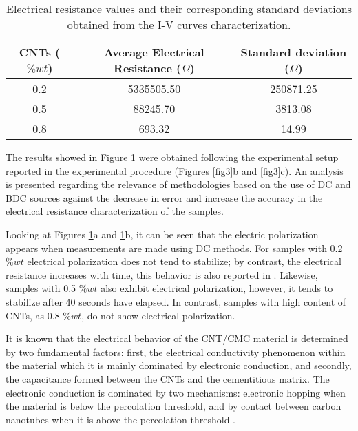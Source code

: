 \documentclass[twocolumn]{bmcart}%
\begin{document}
\begin{table*}[ht]
\caption{Electrical resistance values and their corresponding standard deviations obtained from the I-V curves characterization.}
\centering
\begin{tabular}{|c|c|c|}
\hline
\textbf{CNTs ($\% wt$)} & \textbf{Average Electrical Resistance ($\Omega$)} & \textbf{Standard deviation ($\Omega$)}\\
\hline
0.2 & 5335505.50 & 250871.25\\
\hline
0.5 & 88245.70 & 3813.08\\
\hline
0.8 & 693.32 & 14.99\\
\hline 

\end{tabular}
\label{tab1}
\end{table*}


The results showed in Figure \ref{fig9} were obtained following the experimental setup reported in the experimental procedure (Figures \ref{fig3}b and \ref{fig3}c). An analysis is presented regarding the relevance of methodologies based on the use of DC and BDC sources against the decrease in error and increase the accuracy in the electrical resistance characterization of the samples.

\begin{figure}[h!]
  \caption{
      }
      \label{fig9}
      \end{figure}


Looking at Figures \ref{fig9}a and \ref{fig9}b, it can be seen that the electric polarization  appears when measurements are made using DC methods. For samples with 0.2 $\%wt$ electrical polarization does not tend to stabilize; by contrast, the electrical resistance increases with time, this behavior is also reported in \cite{Garcia-Macias2017a, Downey2017}. Likewise, samples with 0.5 $\%wt$ also exhibit electrical polarization, however, it tends to stabilize after 40 seconds have elapsed. In contrast, samples with high content of CNTs, as 0.8 $\%wt$, do not show electrical polarization.

It is known that the electrical behavior of the CNT/CMC material is determined by two fundamental factors: first, the electrical conductivity phenomenon within the material which it is mainly dominated by electronic conduction, and secondly, the capacitance formed between the CNTs and the cementitious matrix. The electronic conduction is dominated by two mechanisms: electronic hopping when the material is below the percolation threshold, and by contact between carbon nanotubes when it is above the percolation threshold \cite{Garcia-Macias2017a, Downey2017}. 
\end{document}
